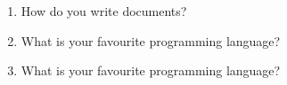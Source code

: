 \documentclass[12pt,onside,a4paper,article]{memoir}
\begin{document}
\begin{enumerate}
\item{How do you write documents?}
\begin{flushright}
\end{flushright}
\item{What is your favourite programming language?}
\begin{flushright}
\end{flushright}
\item{What is your favourite programming language?}
\begin{flushright}
\end{flushright}
\end{enumerate}

\vspace*{4.5cm}
\begin{flushright}
 \end{flushright}
\end{document}
